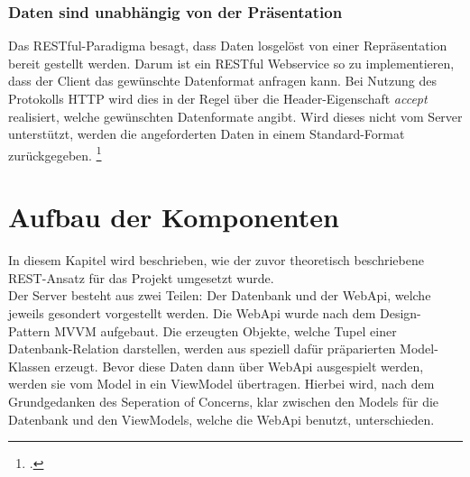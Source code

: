 \subsubsection*{Daten sind unabhängig von der Präsentation}
Das RESTful-Paradigma besagt, dass Daten losgelöst von einer Repräsentation bereit gestellt werden. Darum ist ein RESTful Webservice so zu implementieren, dass der Client das gewünschte Datenformat anfragen kann. Bei Nutzung des Protokolls HTTP wird dies in der Regel über die Header-Eigenschaft \textit{accept} realisiert, welche gewünschten Datenformate angibt. Wird dieses nicht vom Server unterstützt, werden die angeforderten Daten in einem Standard-Format zurückgegeben. \footcite[S. 26ff.]{REST-und-HTTP}
\section{Aufbau der Komponenten}
\label{sec:aufbau-Komponenten}
In diesem Kapitel wird beschrieben, wie der zuvor theoretisch beschriebene REST-Ansatz für das Projekt umgesetzt wurde. \\Der Server besteht aus zwei Teilen: Der Datenbank und der WebApi, welche jeweils gesondert vorgestellt werden. 
Die WebApi wurde nach dem Design-Pattern \ac{MVVM} aufgebaut. Die erzeugten Objekte, welche Tupel einer Datenbank-Relation darstellen, werden aus speziell dafür präparierten Model-Klassen erzeugt. Bevor diese Daten dann über WebApi ausgespielt werden, werden sie vom Model in ein ViewModel übertragen. Hierbei wird, nach dem Grundgedanken des \ac{Seperation of Concerns}, klar zwischen den Models für die Datenbank und den ViewModels, welche die WebApi benutzt, unterschieden. 
